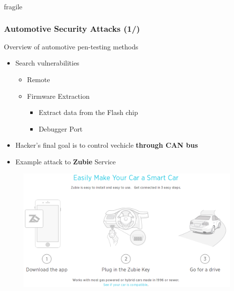 \documentclass[10pt,aspectratio=169]{beamer}
\begin{document}
\begin{frame}{fragile}
    \frametitle{Automotive Security Attacks (1/)}

    Overview of automotive pen-testing methods
    \begin{itemize}
        \item Search vulnerabilities
            \begin{itemize}
                \item Remote
                \item Firmware Extraction
                    \begin{itemize}
                        \item Extract data from the Flash chip
                        \item Debugger Port
                    \end{itemize}
            \end{itemize}
        \item Hacker's final goal is to control vechicle \textbf{through CAN bus}
        \item Example attack to \textbf{Zubie} Service
    \end{itemize}

    \begin{figure}
        \centering
        \includegraphics[trim={0 0 0 0},clip,scale=0.2]{img/zubie.png}
    \end{figure}
\end{frame}
\end{document}
